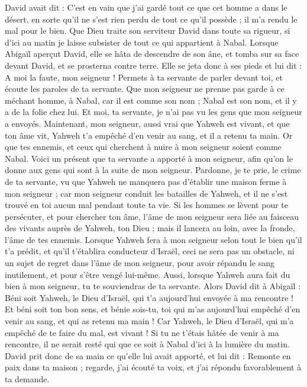 \begin{multicols}{2}
David avait dit : C'est en vain que j'ai gardé tout ce que cet homme a dans le désert, en sorte qu'il ne s'est rien perdu de tout ce qu'il possède ; il m'a rendu le mal pour le bien.
Que Dieu traite son serviteur David dans toute sa rigueur, si d'ici au matin je laisse subsister de tout ce qui appartient à Nabal.
Lorsque Abigaïl aperçut David, elle se hâta de descendre de son âne, et tomba sur sa face devant David, et se prosterna contre terre.
Elle se jeta donc à ses pieds et lui dit : A moi la faute, mon seigneur ! Permets à ta servante de parler devant toi, et écoute les paroles de ta servante.
Que mon seigneur ne prenne pas garde à ce méchant homme, à Nabal, car il est comme son nom ; Nabal est son nom, et il y a de la folie chez lui. Et moi, ta servante, je n'ai pas vu les gens que mon seigneur a envoyés.
Maintenant, mon seigneur, aussi vrai que Yahweh est vivant, et que ton âme vit, Yahweh t'a empêché d'en venir au sang, et il a retenu ta main. Or que tes ennemis, et ceux qui cherchent à nuire à mon seigneur soient comme Nabal.
Voici un présent que ta servante a apporté à mon seigneur, afin qu'on le donne aux gens qui sont à la suite de mon seigneur.
Pardonne, je te prie, le crime de ta servante, vu que Yahweh ne manquera pas d'établir une maison ferme à mon seigneur ; car mon seigneur conduit les batailles de Yahweh, et il ne s'est trouvé en toi aucun mal pendant toute ta vie.
Si les hommes se lèvent pour te persécuter, et pour chercher ton âme, l'âme de mon seigneur sera liée au faisceau des vivants auprès de Yahweh, ton Dieu ; mais il lancera au loin, avec la fronde, l'âme de tes ennemis.
Lorsque Yahweh fera à mon seigneur selon tout le bien qu'il t'a prédit, et qu'il t'établira conducteur d'Israël,
ceci ne sera pas un obstacle, ni un sujet de regret dans l'âme de mon seigneur, pour avoir répandu le sang inutilement, et pour s'être vengé lui-même. Aussi, lorsque Yahweh aura fait du bien à mon seigneur, tu te souviendras de ta servante.
Alors David dit à Abigaïl : Béni soit Yahweh, le Dieu d'Israël, qui t'a aujourd'hui envoyée à ma rencontre !
Et béni soit ton bon sens, et bénie sois-tu, toi qui m'as aujourd'hui empêché d'en venir au sang, et qui as retenu ma main !
Car Yahweh, le Dieu d'Israël, qui m'a empêché de te faire du mal, est vivant ! Si tu ne t'étais hâtée de venir à ma rencontre, il ne serait resté qui que ce soit à Nabal d'ici à la lumière du matin.
David prit donc de sa main ce qu'elle lui avait apporté, et lui dit : Remonte en paix dans ta maison ; regarde, j'ai écouté ta voix, et j'ai répondu favorablement à ta demande.

\end{multicols}
